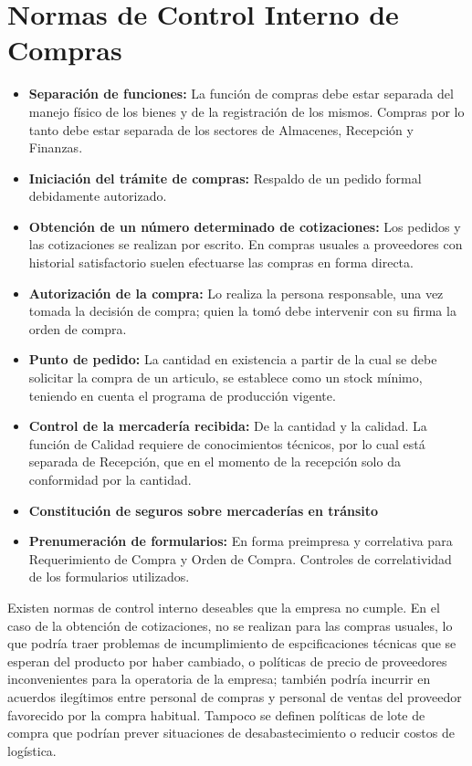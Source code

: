 \pagebreak
\section{Normas de Control Interno de Compras}
\begin{itemize}

 \item	{\bf Separaci\'on de funciones: } La función de compras debe estar separada del manejo físico de los bienes y de la registración de los mismos. Compras por lo tanto debe estar separada de los sectores de
Almacenes, Recepción y Finanzas.

 \item	{\bf Iniciación del trámite de compras: } Respaldo de un pedido formal debidamente autorizado.

 \item	{\bf Obtención de un número determinado de cotizaciones: } Los
pedidos y las cotizaciones se realizan por escrito. En compras usuales a proveedores con historial satisfactorio suelen efectuarse las compras en forma directa.

 \item	{\bf Autorización de la compra: } Lo realiza la persona responsable, una vez tomada la decisión de compra; quien la tomó debe intervenir con su firma la orden de compra.

 \item	{\bf Punto de pedido: } La cantidad en existencia a partir de la cual se debe solicitar la compra de un articulo, se establece como un stock mínimo, teniendo en cuenta el programa de producción vigente.

 \item	{\bf Control de la mercadería recibida: } De la cantidad y la calidad. La función de Calidad requiere de conocimientos técnicos, por lo cual está separada de Recepción, que en el momento de la recepción solo da conformidad por la cantidad.

 \item	{\bf Constitución de seguros sobre mercaderías en tránsito }
 
 \item	{\bf Prenumeración de formularios: } En forma preimpresa y correlativa para Requerimiento de Compra y Orden de
Compra. Controles de correlatividad de
los formularios utilizados.
\end{itemize}
Existen normas de control interno deseables que la empresa no cumple. En el caso de la obtención de cotizaciones, no se realizan para las compras usuales, lo que podría traer problemas de incumplimiento de espcificaciones técnicas que se esperan del producto por haber cambiado, o políticas de precio de proveedores inconvenientes para la operatoria de la empresa; también podría incurrir en acuerdos ilegítimos entre personal de compras y personal de ventas del proveedor favorecido por la compra habitual. Tampoco se definen políticas de lote de compra que podrían prever situaciones de desabastecimiento o reducir costos de logística.
